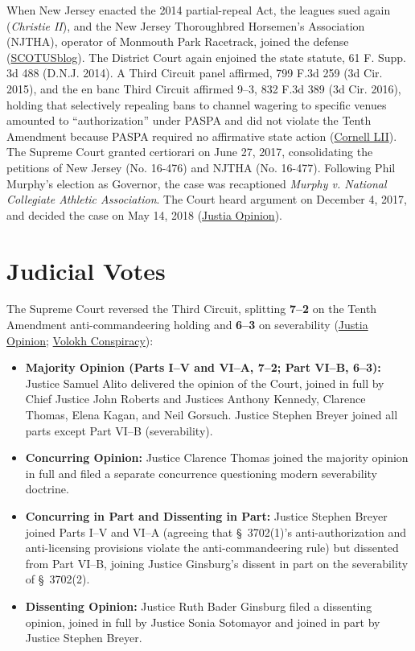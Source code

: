 \documentclass[12pt]{article}
\begin{document}
When New Jersey enacted the 2014 partial-repeal Act, the leagues sued again (\textit{Christie II}), and the New Jersey Thoroughbred Horsemen's Association (NJTHA), operator of Monmouth Park Racetrack, joined the defense (\href{https://www.scotusblog.com/2018/05/opinion-analysis-justices-strike-down-federal-sports-gambling-law/}{SCOTUSblog}). The District Court again enjoined the state statute, 61 F. Supp. 3d 488 (D.N.J. 2014). A Third Circuit panel affirmed, 799 F.3d 259 (3d Cir. 2015), and the en banc Third Circuit affirmed 9--3, 832 F.3d 389 (3d Cir. 2016), holding that selectively repealing bans to channel wagering to specific venues amounted to ``authorization'' under PASPA and did not violate the Tenth Amendment because PASPA required no affirmative state action (\href{https://www.law.cornell.edu/supremecourt/text/16-476}{Cornell LII}). The Supreme Court granted certiorari on June 27, 2017, consolidating the petitions of New Jersey (No. 16-476) and NJTHA (No. 16-477). Following Phil Murphy's election as Governor, the case was recaptioned \textit{Murphy v. National Collegiate Athletic Association}. The Court heard argument on December 4, 2017, and decided the case on May 14, 2018 (\href{https://supreme.justia.com/cases/federal/us/584/16-476/}{Justia Opinion}).

\section{Judicial Votes}

The Supreme Court reversed the Third Circuit, splitting \textbf{7--2} on the Tenth Amendment anti-commandeering holding and \textbf{6--3} on severability (\href{https://supreme.justia.com/cases/federal/us/584/16-476/}{Justia Opinion}; \href{https://reason.com/volokh/2018/05/14/sports-gambling-decision-is-a-major-vict/}{Volokh Conspiracy}):

\begin{itemize}
    \item \textbf{Majority Opinion (Parts I--V and VI--A, 7--2; Part VI--B, 6--3):} Justice Samuel Alito delivered the opinion of the Court, joined in full by Chief Justice John Roberts and Justices Anthony Kennedy, Clarence Thomas, Elena Kagan, and Neil Gorsuch. Justice Stephen Breyer joined all parts except Part VI--B (severability).
    \item \textbf{Concurring Opinion:} Justice Clarence Thomas joined the majority opinion in full and filed a separate concurrence questioning modern severability doctrine.
    \item \textbf{Concurring in Part and Dissenting in Part:} Justice Stephen Breyer joined Parts I--V and VI--A (agreeing that \S~3702(1)'s anti-authorization and anti-licensing provisions violate the anti-commandeering rule) but dissented from Part VI--B, joining Justice Ginsburg's dissent in part on the severability of \S~3702(2).
    \item \textbf{Dissenting Opinion:} Justice Ruth Bader Ginsburg filed a dissenting opinion, joined in full by Justice Sonia Sotomayor and joined in part by Justice Stephen Breyer.
\end{itemize}
\end{document}
